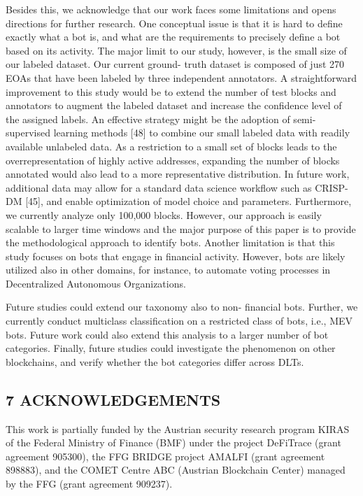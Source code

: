 Besides this, we acknowledge that our work faces some limitations and opens directions for further research. One conceptual issue is that it is hard to define exactly what a bot is, and what are the requirements to precisely define a bot based on its activity. The major limit to our study, however, is the small size of our labeled dataset. Our current ground- truth dataset is composed of just 270 EOAs that have been labeled by three independent annotators. A straightforward improvement to this study would be to extend the number of test blocks and annotators to augment the labeled dataset and increase the confidence level of the assigned labels. An effective strategy might be the adoption of semi- supervised learning methods [48] to combine our small labeled data with readily available unlabeled data. As a restriction to a small set of blocks leads to the overrepresentation of highly active addresses, expanding the number of blocks annotated would also lead to a more representative distribution. In future work, additional data may allow for a standard data science workflow such as CRISP- DM [45], and enable optimization of model choice and parameters. Furthermore, we currently analyze only 100,000 blocks. However, our approach is easily scalable to larger time windows and the major purpose of this paper is to provide the methodological approach to identify bots. Another limitation is that this study focuses on bots that engage in financial activity. However, bots are likely utilized also in other domains, for instance, to automate voting processes in Decentralized Autonomous Organizations.

Future studies could extend our taxonomy also to non- financial bots. Further, we currently conduct multiclass classification on a restricted class of bots, i.e., MEV bots. Future work could also extend this analysis to a larger number of bot categories. Finally, future studies could investigate the phenomenon on other blockchains, and verify whether the bot categories differ across DLTs.

\subsection*{7 ACKNOWLEDGEMENTS}

This work is partially funded by the Austrian security research program KIRAS of the Federal Ministry of Finance (BMF) under the project DeFiTrace (grant agreement 905300), the FFG BRIDGE project AMALFI (grant agreement 898883), and the COMET Centre ABC (Austrian Blockchain Center) managed by the FFG (grant agreement 909237).

\begin{center}
    
\end{center}
